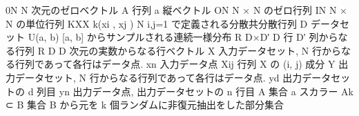0N N 次元のゼロベクトル
A 行列
a 縦ベクトル
ON N × N のゼロ行列
IN N × N の単位行列
KXX {k(xi
, xj )}
N
i,j=1 で定義される分散共分散行列
D データセット
U(a, b) [a, b] からサンプルされる連続一様分布
R
D×D′ D 行 D′ 列からなる行列
R
D D 次元の実数からなる行ベクトル
X 入力データセット, N 行からなる行列であって各行はデータ点.
xn 入力データ点
Xij 行列 X の (i, j) 成分
Y 出力データセット, N 行からなる行列であって各行はデータ点.
yd 出力データセットの d 列目
yn 出力データ点, 出力データセットの n 行目
A 集合
a スカラー
Ak ⊂ B 集合 B から元を k 個ランダムに非復元抽出をした部分集合